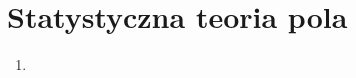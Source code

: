 \documentclass[a4paper,11pt]{article}
\begin{document}










\section{Statystyczna teoria pola}





\begin{enumerate}

\item






















\end{enumerate}
\end{document}
